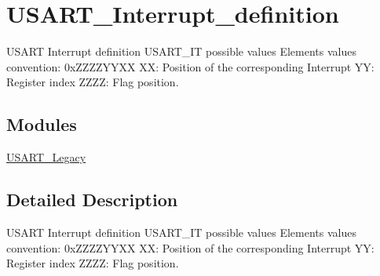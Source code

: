\hypertarget{group___u_s_a_r_t___interrupt__definition}{\section{U\-S\-A\-R\-T\-\_\-\-Interrupt\-\_\-definition}
\label{group___u_s_a_r_t___interrupt__definition}
}


U\-S\-A\-R\-T Interrupt definition U\-S\-A\-R\-T\-\_\-\-I\-T possible values Elements values convention\-: 0x\-Z\-Z\-Z\-Z\-Y\-Y\-X\-X X\-X\-: Position of the corresponding Interrupt Y\-Y\-: Register index Z\-Z\-Z\-Z\-: Flag position.  


\subsection*{Modules}
\begin{DoxyCompactItemize}
\item 
\hyperlink{group___u_s_a_r_t___legacy}{U\-S\-A\-R\-T\-\_\-\-Legacy}
\end{DoxyCompactItemize}


\subsection{Detailed Description}
U\-S\-A\-R\-T Interrupt definition U\-S\-A\-R\-T\-\_\-\-I\-T possible values Elements values convention\-: 0x\-Z\-Z\-Z\-Z\-Y\-Y\-X\-X X\-X\-: Position of the corresponding Interrupt Y\-Y\-: Register index Z\-Z\-Z\-Z\-: Flag position. 